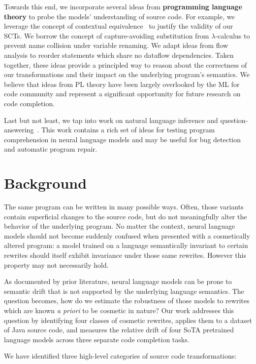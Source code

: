 \documentclass[usenames,dvipsnames]{article} %
\begin{document}
  Towards this end, we incorporate several ideas from \textbf{programming language theory} to probe the models' understanding of source code. For example, we leverage the concept of contextual equivalence~\citep{morris1969lambda} to justify the validity of our SCTs. We borrow the concept of capture-avoiding substitution from $\lambda$-calculus to prevent name collision under variable renaming. We adapt ideas from flow analysis to reorder statements which share no dataflow dependencies. Taken together, these ideas provide a principled way to reason about the correctness of our transformations and their impact on the underlying program's semantics. We believe that ideas from PL theory have been largely overlooked by the ML for code community and represent a significant opportunity for future research on code completion.

  Last but not least, we tap into work on natural language inference and question-answering~\citep{liu2021codeqa}. This work contains a rich set of ideas for testing program comprehension in neural language models and may be useful for bug detection and automatic program repair.

  \pagebreak\section{Background}\label{sec:background}

  The same program can be written in many possible ways. Often, those variants contain superficial changes to the source code, but do not meaningfully alter the behavior of the underlying program. No matter the context, neural language models should not become suddenly confused when presented with a cosmetically altered program: a model trained on a language semantically invariant to certain rewrites should itself exhibit invariance under those same rewrites. However this property may not necessarily hold.

  As documented by prior literature, neural language models can be prone to semantic drift that is not supported by the underlying language semantics. The question becomes, how do we estimate the robustness of those models to rewrites which are known \textit{a priori} to be cosmetic in nature? Our work addresses this question by identifying four classes of cosmetic rewrites, applies them to a dataset of Java source code, and measures the relative drift of four SoTA pretrained language models across three separate code completion tasks.

We have identified three high-level categories of source code transformations:
\end{document}
